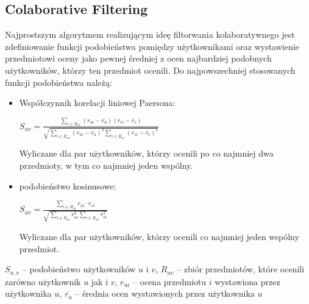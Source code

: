\documentclass{pracamgr}
\begin{document}
   \subsection{Colaborative Filtering}%
    Najprostszym algorytmem realizującym ideę filtorwania kolaboratywnego jest zdefiniowanie funkcji podobieństwa pomiędzy użytkownikami
    oraz wystawienie przedmiotowi oceny jako pewnej średniej z ocen najbardziej podobnych użytkowników, którzy ten przedmiot ocenili.\newline
    Do najpowszechniej stosowanych funkcji podobieństwa należą:
    \begin{itemize}\itemsep1pt \parskip0pt 
     \item Współczynnik korelacji liniowej Paersona:
      \begin{center}
       $S_{uv}=\frac{\sum\limits_{i\in R_{uv}}(r_{ui}-\overline{r_u})(r_{vi}-\overline{r_v})}
       {\sqrt{\sum\limits_{i\in R_{uv}}(r_{ui}-\overline{r_u})^2\sum\limits_{i\in R_{uv}}(r_{vi}-\overline{r_v})^2}}$
      \end{center}
      Wyliczane dla par użytkowników, którzy ocenili po co najmniej dwa przedmioty, w tym co najmniej jeden wspólny.
     \item podobieństwo kosinusowe:
      \begin{center}
       $S_{uv}=\frac{\sum\limits_{i\in R_{uv}}r_{ui}\cdot r_{vi}}
       {\sqrt{\sum\limits_{i\in R_{uv}}r_{ui}^2\sum\limits_{i\in R_{uv}}r_{vi}^2}}$
      \end{center}
      Wyliczane dla par użytkowników, którzy ocenili co najmniej jeden wspólny przedmiot.
    \end{itemize}
    {\scriptsize
     $S_{u,v}$ -- podobieństwo użytkowników $u$ i $v$, $R_{uv}$ -- zbiór przedmiotów, które ocenili zarówno użytkownik $u$ jak i $v$,\newline
     $r_{ui}$ -- ocena przedmiotu $i$ wystawiona przez użytkownika $u$, $\overline{r_{u}}$ -- średnia ocen wystawionych przez użytkownika $u$
    }\newline
\end{document}
